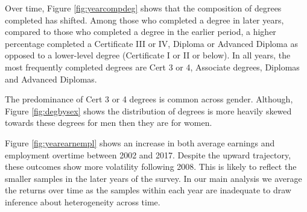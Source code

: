 \documentclass[12pt, a4paper]{article}
\begin{document}
Over time, Figure \ref{fig:yearcompdeg} shows that the composition of degrees completed has shifted. Among those who completed a degree in later years, compared to those who completed a degree in the earlier period, a higher percentage completed a Certificate III or IV, Diploma or Advanced Diploma as opposed to a lower-level degree (Certificate I or II or below). In all years, the most frequently completed degrees are Cert 3 or 4, Associate degrees, Diplomas and Advanced Diplomas. 



The predominance of Cert 3 or 4 degrees is common across gender. Although, Figure \ref{fig:degbysex} shows the distribution of degrees is more heavily skewed towards these degrees for men then they are for women. 

Figure \ref{fig:yearearnempl} shows an increase in both average earnings and employment overtime between 2002 and 2017. Despite the upward trajectory, these outcomes show more volatility following 2008. This is likely to reflect the smaller samples in the later years of the survey. In our main analysis we average the returns over time as the samples within each year are inadequate to draw inference about heterogeneity across time.

\end{document}
